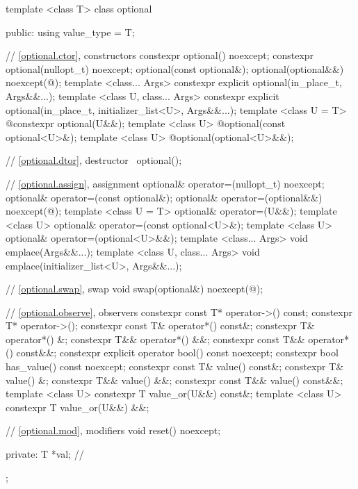 %
\begin{codeblock}
template <class T>
  class optional {
  public:
    using value_type = T;

    // \ref{optional.ctor}, constructors
    constexpr optional() noexcept;
    constexpr optional(nullopt_t) noexcept;
    optional(const optional&);
    optional(optional&&) noexcept(@\seebelow@);
    template <class... Args>
      constexpr explicit optional(in_place_t, Args&&...);
    template <class U, class... Args>
      constexpr explicit optional(in_place_t, initializer_list<U>, Args&&...);
    template <class U = T>
      @\EXPLICIT@ constexpr optional(U&&);
    template <class U>
      @\EXPLICIT@ optional(const optional<U>&);
    template <class U>
      @\EXPLICIT@ optional(optional<U>&&);

    // \ref{optional.dtor}, destructor
    ~optional();

    // \ref{optional.assign}, assignment
    optional& operator=(nullopt_t) noexcept;
    optional& operator=(const optional&);
    optional& operator=(optional&&) noexcept(@\seebelow@);
    template <class U = T> optional& operator=(U&&);
    template <class U> optional& operator=(const optional<U>&);
    template <class U> optional& operator=(optional<U>&&);
    template <class... Args> void emplace(Args&&...);
    template <class U, class... Args> void emplace(initializer_list<U>, Args&&...);

    // \ref{optional.swap}, swap
    void swap(optional&) noexcept(@\seebelow@);

    // \ref{optional.observe}, observers
    constexpr const T* operator->() const;
    constexpr T* operator->();
    constexpr const T& operator*() const&;
    constexpr T& operator*() &;
    constexpr T&& operator*() &&;
    constexpr const T&& operator*() const&&;
    constexpr explicit operator bool() const noexcept;
    constexpr bool has_value() const noexcept;
    constexpr const T& value() const&;
    constexpr T& value() &;
    constexpr T&& value() &&;
    constexpr const T&& value() const&&;
    template <class U> constexpr T value_or(U&&) const&;
    template <class U> constexpr T value_or(U&&) &&;

    // \ref{optional.mod}, modifiers
    void reset() noexcept;

  private:
    T *val; // \expos
  };
\end{codeblock}

